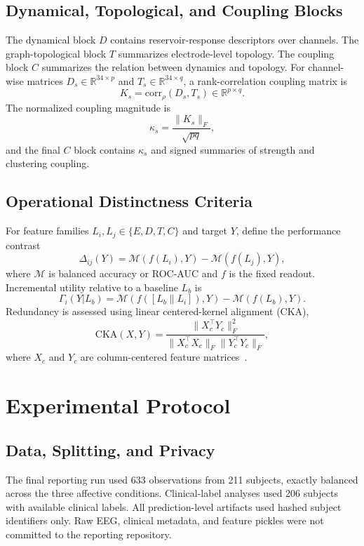 \documentclass[journal]{IEEEtran}
\begin{document}
\subsection{Dynamical, Topological, and Coupling Blocks}
The dynamical block $D$ contains reservoir-response descriptors over channels. The graph-topological block $T$ summarizes electrode-level topology. The coupling block $C$ summarizes the relation between dynamics and topology. For channel-wise matrices $D_s\in\mathbb{R}^{34\times p}$ and $T_s\in\mathbb{R}^{34\times q}$, a rank-correlation coupling matrix is
\begin{equation}
K_s = \mathrm{corr}_{\rho}(D_s,T_s) \in \mathbb{R}^{p\times q}.
\end{equation}
The normalized coupling magnitude is
\begin{equation}
\kappa_s = \frac{\|K_s\|_F}{\sqrt{pq}},
\label{eq:kappa}
\end{equation}
and the final $C$ block contains $\kappa_s$ and signed summaries of strength and clustering coupling.

\subsection{Operational Distinctness Criteria}
For feature families $L_i,L_j\in\{E,D,T,C\}$ and target $Y$, define the performance contrast
\begin{equation}
\Delta_{ij}(Y)=\mathcal{M}(f(L_i),Y)-\mathcal{M}(f(L_j),Y),
\label{eq:contrast}
\end{equation}
where $\mathcal{M}$ is balanced accuracy or ROC-AUC and $f$ is the fixed readout. Incremental utility relative to a baseline $L_b$ is
\begin{equation}
\Gamma_i(Y|L_b)=\mathcal{M}(f([L_b\|L_i]),Y)-\mathcal{M}(f(L_b),Y).
\label{eq:increment}
\end{equation}
Redundancy is assessed using linear centered-kernel alignment (CKA),
\begin{equation}
\mathrm{CKA}(X,Y)=\frac{\|X_c^{\top}Y_c\|_F^2}{\|X_c^{\top}X_c\|_F\|Y_c^{\top}Y_c\|_F},
\label{eq:cka}
\end{equation}
where $X_c$ and $Y_c$ are column-centered feature matrices~\cite{kornblith2019similarity}.

\section{Experimental Protocol}
\subsection{Data, Splitting, and Privacy}
The final reporting run used 633 observations from 211 subjects, exactly balanced across the three affective conditions. Clinical-label analyses used 206 subjects with available clinical labels. All prediction-level artifacts used hashed subject identifiers only. Raw EEG, clinical metadata, and feature pickles were not committed to the reporting repository.
\end{document}
